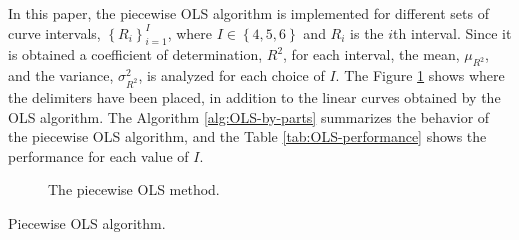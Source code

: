 \documentclass[english]{sobraep}
\begin{document}
In this paper, the piecewise OLS algorithm is implemented for different sets of curve intervals, \(\left\{ R_i \right\}_{i=1}^{I}\), where \(I \in \left\{ 4,5,6 \right\}\) and \(R_i\) is the \(i\)th interval. Since it is obtained a coefficient of determination, \(R^2\), for each interval, the mean, \(\mu_{R^2}\), and the variance, \(\sigma_{R^2}^2\), is analyzed for each choice of \(I\). The Figure \ref{fig:OLS-by-parts} shows where the delimiters have been placed, in addition to the linear curves obtained by the OLS algorithm. The Algorithm \ref{alg:OLS-by-parts} summarizes the behavior of the piecewise OLS algorithm, and the Table \ref{tab:OLS-performance} shows the performance for each value of \(I\).

\begin{figure}[htp]
    

    
    \caption{The piecewise OLS method.}
    \label{fig:OLS-by-parts}
\end{figure}

\begin{algorithm}[!ht]
    \DontPrintSemicolon
      
        {
        }
    
    \caption{Piecewise OLS algorithm.}
    \label{alg:OLS-by-parts}
\end{algorithm}
\end{document}
